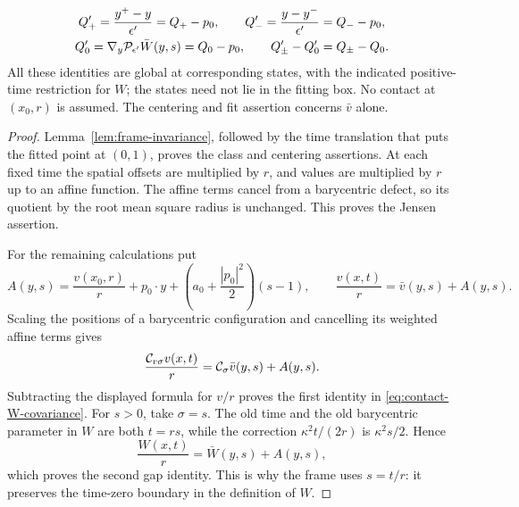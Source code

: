\begin{lemma}
\begin{equation}\label{eq:contact-velocity-covariance}
\begin{gathered}
  Q'_+=\frac{y^+-y}{\epsilon'}=Q_+-p_0,\qquad
  Q'_- =\frac{y-y^-}{\epsilon'}=Q_--p_0,\\
  Q'_0=\nabla_y\mathcal{P}_{\epsilon'}\bar W(y,s)=Q_0-p_0,\qquad
  Q'_\pm-Q'_0=Q_\pm-Q_0.
\end{gathered}
\end{equation}
All these identities are global at corresponding states, with the indicated
positive-time restriction for $W$; the states need not lie in the fitting
box.  No contact at $(x_0,r)$ is assumed.  The centering and fit assertion
concerns $\bar v$ alone.
\end{lemma}

\begin{proof}
Lemma~\ref{lem:frame-invariance}, followed by the time translation that puts
the fitted point at $(0,1)$, proves the class and centering assertions.  At
each fixed time the spatial offsets are multiplied by $r$, and values are
multiplied by $r$ up to an affine function.  The affine terms cancel from a
barycentric defect, so its quotient by the root mean square radius is
unchanged.  This proves the Jensen assertion.

For the remaining calculations put
\[
  A(y,s)=\frac{v(x_0,r)}{r}+p_0\cdot y
             +\left(a_0+\frac{|p_0|^2}{2}\right)(s-1),
  \qquad \frac{v(x,t)}{r}=\bar v(y,s)+A(y,s).
\]
Scaling the positions of a barycentric configuration and cancelling its
weighted affine terms gives
\[
  \frac{\mathcal{C}_{r\sigma}v(x,t)}{r}
       =\mathcal{C}_\sigma\bar v(y,s)+A(y,s).
\]
Subtracting the displayed formula for $v/r$ proves the first identity in
\eqref{eq:contact-W-covariance}.  For $s>0$, take $\sigma=s$.  The old time
and the old barycentric parameter in $W$ are both $t=rs$, while the
correction $\kappa^2t/(2r)$ is $\kappa^2s/2$.  Hence
\[
  \frac{W(x,t)}{r}=\bar W(y,s)+A(y,s),
\]
which proves the second gap identity.  This is why the frame uses $s=t/r$:
it preserves the time-zero boundary in the definition of $W$.


\end{proof}
